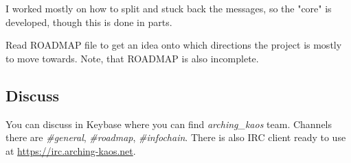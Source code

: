 \documentclass[10pt,a4paper,twocolumn]{paper}
\begin{document}
I worked mostly on how to split and stuck back the messages, so the "core" is developed, though this is done in parts.

Read ROADMAP file to get an idea onto which directions the project is mostly to move towards. Note, that ROADMAP is also incomplete.

\subsection{Discuss}
You can discuss in Keybase where you can find \textit{arching\_kaos} team.
Channels there are \textit{\#general}, \textit{\#roadmap}, \textit{\#infochain}. There is also IRC
client ready to use at \url{https://irc.arching-kaos.net}.
\end{document}
